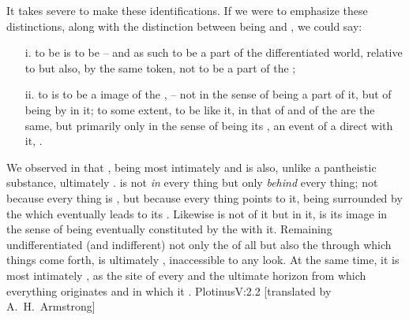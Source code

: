 It takes severe  to make these identifications. 
If we were to emphasize these distinctions, along with the distinction between
being and , we could say:
\begin{itemize}\MyLPar
\item[i.] to be is to be  -- and as such to be a part of the
differentiated world, relative to  but also, by the same token,
not to be a part of the ;
\item[ii.]
to  is to be a
 image of the ,  -- not in the sense
of being a part of it, but of being  by  in it; to
some extent, to be like it, in that  of  and
 of the  are the same, but primarily  only in the sense of
being its , an event of a direct 
with it, .
\end{itemize}

\pa\label{immanentTranscendent}
We observed in  that
, being most intimately  and  is also, unlike a
pantheistic substance, ultimately . 
 is  not {\em in} every thing but only {\em behind} every
thing; not because every thing is , but because every thing points
to it, being surrounded by the  which eventually leads to its
. Likewise  is not  of it but
 in it, is its image in the sense of being eventually
constituted by the  with it.  Remaining undifferentiated (and
indifferent)  not only the  of all  but
also the  through which things come forth,  is ultimately
, inaccessible to any  look. At the same time, it is
most intimately , as the site of every  and
the ultimate horizon from which everything originates and in which it
. \citet{All these things are the One and not the One: they are
  He because they come from Him; they are not He, because it is in abiding by
  Himself that he gives them.}{Plotinus}{V:2.2 [translated by A.~H.~Armstrong]}

